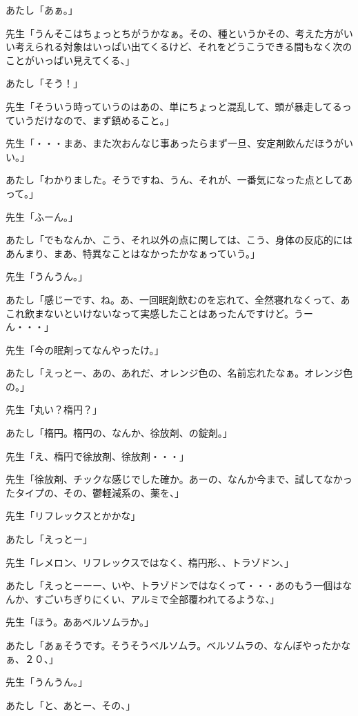 \documentclass[b5j,twoside,twocolumn]{utarticle}
\begin{document}
\begin{description}
\item あたし「あぁ。」
\item 先生「うんそこはちょっとちがうかなぁ。その、種というかその、考えた方がいい考えられる対象はいっぱい出てくるけど、それをどうこうできる間もなく次のことがいっぱい見えてくる、」
\item あたし「そう！」
\item 先生「そういう時っていうのはあの、単にちょっと混乱して、頭が暴走してるっていうだけなので、まず鎮めること。」
\item 先生「・・・まあ、また次おんなじ事あったらまず一旦、安定剤飲んだほうがいい。」
\item あたし「わかりました。そうですね、うん、それが、一番気になった点としてあって。」
\item 先生「ふーん。」
\item あたし「でもなんか、こう、それ以外の点に関しては、こう、身体の反応的にはあんまり、まあ、特異なことはなかったかなぁっていう。」
\item 先生「うんうん。」
\item あたし「感じーです、ね。あ、一回眠剤飲むのを忘れて、全然寝れなくって、あこれ飲まないといけないなって実感したことはあったんですけど。うーん・・・」
\item 先生「今の眠剤ってなんやったけ。」
\item あたし「えっとー、あの、あれだ、オレンジ色の、名前忘れたなぁ。オレンジ色の。」
\item 先生「丸い？楕円？」
\item あたし「楕円。楕円の、なんか、徐放剤、の錠剤。」
\item 先生「え、楕円で徐放剤、徐放剤・・・」
\item 先生「徐放剤、チックな感じでした確か。あーの、なんか今まで、試してなかったタイプの、その、鬱軽減系の、薬を、」
\item 先生「リフレックスとかかな」
\item あたし「えっとー」
\item 先生「レメロン、リフレックスではなく、楕円形、、トラゾドン、」
\item あたし「えっとーーー、いや、トラゾドンではなくって・・・あのもう一個はなんか、すごいちぎりにくい、アルミで全部覆われてるような、」
\item 先生「ほう。ああベルソムラか。」
\item あたし「あぁそうです。そうそうベルソムラ。ベルソムラの、なんぼやったかなぁ、２０、」
\item 先生「うんうん。」
\item あたし「と、あとー、その、」

\end{description}
\end{document}
